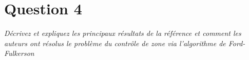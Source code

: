 \section{Question 4}
\textit{Décrivez et expliquez les principaux résultats de la référence et comment les auteurs ont résolus le problème du contrôle de zone via l'algorithme de Ford-Fulkerson}